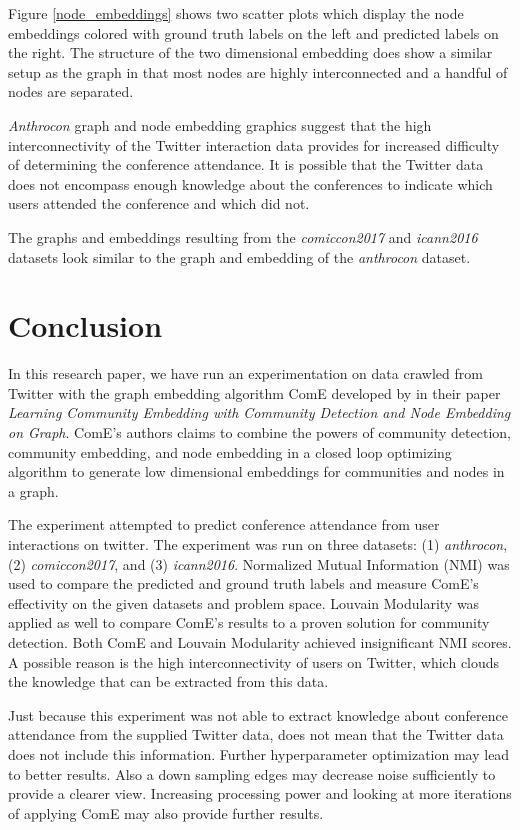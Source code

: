 \documentclass[sigconf]{acmart}
\begin{document}
Figure \ref{node_embeddings} shows two scatter plots which display the node embeddings colored with ground truth labels on the left and predicted labels on the right. The structure of the two dimensional embedding does show a similar setup as the graph in that most nodes are highly interconnected and a handful of nodes are separated.

\textit{Anthrocon} graph and node embedding graphics suggest that the high interconnectivity of the Twitter interaction data provides for increased difficulty of determining the conference attendance. It is possible that the Twitter data does not encompass enough knowledge about the conferences to indicate which users attended the conference and which did not.

The graphs and embeddings resulting from the \textit{comiccon2017} and  \textit{icann2016} datasets look similar to the graph and embedding of the \textit{anthrocon} dataset.

\section{Conclusion}

In this research paper, we have run an experimentation on data crawled from Twitter with the graph embedding algorithm ComE developed by \citeauthor{Cav17} in their \citeyear{Cav17} paper \textit{Learning Community Embedding with Community Detection and Node Embedding on Graph}. ComE's authors claims to combine the powers of community detection, community embedding, and node embedding in a closed loop optimizing algorithm to generate low dimensional embeddings for communities and nodes in a graph.

The experiment attempted to predict conference attendance from user interactions on twitter. The experiment was run on three datasets: (1) \textit{anthrocon}, (2) \textit{comiccon2017}, and (3) \textit{icann2016}. Normalized Mutual Information (NMI) was used to compare the predicted and ground truth labels and measure ComE's effectivity on the given datasets and problem space. Louvain Modularity was applied as well to compare ComE's results to a proven solution for community detection. Both ComE and Louvain Modularity achieved insignificant NMI scores. A possible reason is the high interconnectivity of users on Twitter, which clouds the knowledge that can be extracted from this data.

Just because this experiment was not able to extract knowledge about conference attendance from the supplied Twitter data, does not mean that the Twitter data does not include this information. Further hyperparameter optimization may lead to better results. Also a down sampling edges may decrease noise sufficiently to provide a clearer view. Increasing processing power and looking at more iterations of applying ComE may also provide further results.



\end{document}
